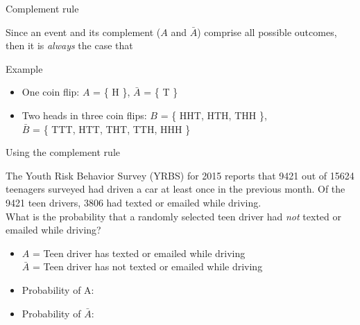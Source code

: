 \documentclass[xcolor=table, aspectratio=169, bigger]{beamer}
\begin{document}
\begin{frame}{Complement rule }
\begin{block}{}
Since an event and its complement ($A$ and $\bar A$) comprise all possible outcomes, then it is \emph{always} the case that\\
\end{block}

\pause

\begin{exampleblock}{Example}
\begin{itemize}
\item One coin flip: $A$ = \{ H \}, $\bar A$ = \{ T \}\\
\pause
{}

\pause
\item Two heads in three coin flips: $B$ = \{ HHT, HTH, THH \},\\ $\bar B$ = \{ TTT, HTT, THT, TTH, HHH \}\\
\pause
{}
\end{itemize}
\end{exampleblock}
\end{frame}

\begin{frame}{Using the complement rule}
\begin{exampleblock}{}
The Youth Risk Behavior Survey (YRBS) for 2015 reports that 9421 out of 15624 teenagers surveyed had driven a car at least once in the previous month. Of the 9421 teen drivers, 3806 had texted or emailed while driving. \\
\medskip
What is the probability that a randomly selected teen driver had \emph{not} texted or emailed while driving? 

\begin{itemize}
\pause
\item $A$ = Teen driver has texted or emailed while driving\\
$\bar A$ = Teen driver has not texted or emailed while driving
\pause
\item Probability of A:\\
\pause
\item Probability of $\bar A$:\\
\end{itemize}
\end{exampleblock}
\end{frame}
\end{document}
